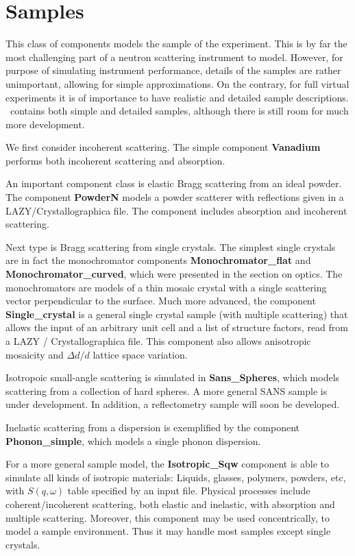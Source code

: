 \chapter{Samples}
\label{c:samples}

This class of components models the sample of the experiment.
This is by far the most challenging part of a neutron scattering
instrument to model. However, for purpose of simulating
instrument performance, details of the samples are rather unimportant,
allowing for simple approximations. On the contrary, for full
virtual experiments it is of importance to have realistic and
detailed sample descriptions. \MCS\ contains both simple and detailed
samples, although there is still room for much more development.

We first consider incoherent scattering. The simple component {\bf Vanadium}
performs both incoherent scattering and absorption.

An important component class is elastic Bragg scattering from an ideal powder.
The component {\bf PowderN} models a powder scatterer with reflections
given in a LAZY/Crystallographica file.
The component includes absorption and incoherent scattering.

Next type is Bragg scattering from single crystals.
The simplest single crystals are in fact the monochromator components
{\bf Monochromator\_flat} and {\bf Monochromator\_curved},
which were presented in the section on optics.
The monochromators are models of a thin mosaic crystal
with a single scattering vector perpendicular to the surface.
Much more advanced, the component {\bf Single\_crystal}
is a general single crystal sample (with multiple scattering) that allows
the input of an arbitrary unit cell and a list of structure factors, read
from a LAZY / Crystallographica file.
This component also allows anisotropic mosaicity
and $\Delta d/d$ lattice space variation.

Isotropoic small-angle scattering is simulated in {\bf Sans\_Spheres},
which models scattering from a collection of hard spheres. A more general
SANS sample is under development.
In addition, a reflectometry sample will soon be developed.

Inelastic scattering from a dispersion is exemplified by
the component {\bf Phonon\_simple}, which models a single phonon dispersion.

For a more general sample model, the {\bf Isotropic\_Sqw} component
is able to simulate all kinds of isotropic materials:
Liquids, glasses, polymers, powders, etc, with $S(q,\omega)$ table
specified by an input file.
Physical processes include coherent/incoherent scattering,
both elastic and inelastic, with absorption and multiple scattering.
Moreover, this component may be used concentrically,
to model a sample environment.
Thus it may handle most samples except single crystals.

